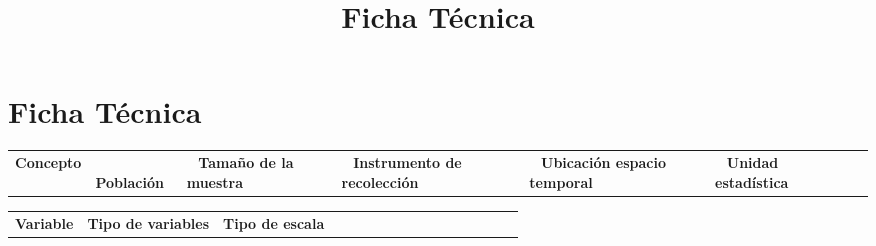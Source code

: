\documentclass[
]{article}
\title{Ficha Técnica}
\author{}
\date{\vspace{-2.5em}}
\begin{document}
\maketitle

\section*{Ficha Técnica}

\begin{tabular}{>{\raggedright\arraybackslash}p{5cm} p{10cm}}
\toprule
\textbf{Concepto} & \ \midrule
\textbf{Población} & \ \midrule
\textbf{Tamaño de la muestra} & \ \midrule
\textbf{Instrumento de recolección} & \ \midrule
\textbf{Ubicación espacio temporal} & \ \midrule
\textbf{Unidad estadística} & \ \bottomrule
\end{tabular}

\vspace{0.5cm}

\begin{tabular}{>{\raggedright\arraybackslash}p{5cm} >{\raggedright\arraybackslash}p{4cm} >{\raggedright\arraybackslash}p{4cm}}
\toprule
\textbf{Variable} & \textbf{Tipo de variables} & \textbf{Tipo de escala} \ \midrule
& & \ \midrule
& & \ \midrule
& & \ \midrule
& & \ \midrule
& & \ \bottomrule
\end{tabular}
\end{document}
